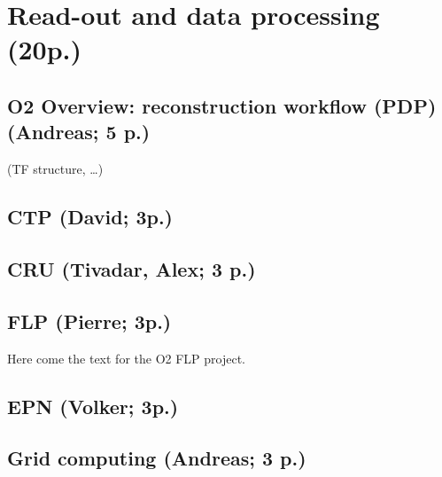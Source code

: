 \section{Read-out and data processing (20p.)}
\subsection{O2 Overview: reconstruction workflow (PDP) (Andreas; 5 p.)}
(TF structure, …)
\subsection{CTP (David; 3p.)}
\subsection{CRU (Tivadar, Alex; 3 p.)}
\subsection{FLP (Pierre; 3p.)}
Here come the text for the O2 FLP project.
\subsection{EPN (Volker; 3p.)}
\subsection{Grid computing (Andreas; 3 p.)}
